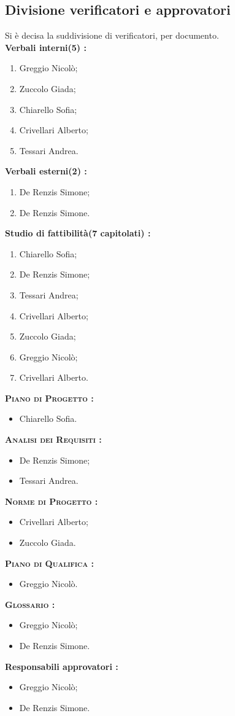 \subsection{Divisione verificatori e approvatori}
Si è decisa la suddivisione di verificatori, per documento.\\
\textbf{Verbali interni(5) :}
\begin{enumerate}
	\item Greggio Nicolò;
	\item Zuccolo Giada;
	\item Chiarello Sofia;
	\item Crivellari Alberto;
	\item Tessari Andrea.
\end{enumerate}
\textbf{Verbali esterni(2) :}
\begin{enumerate}
	\item De Renzis Simone;
	\item De Renzis Simone.
\end{enumerate}
\textbf{Studio di fattibilità(7 capitolati) :}
\begin{enumerate}
	\item Chiarello Sofia;
	\item De Renzis Simone;
	\item Tessari Andrea;
	\item Crivellari Alberto;
	\item Zuccolo Giada;
	\item Greggio Nicolò;
	\item Crivellari Alberto.
\end{enumerate}
\textbf{\textsc{Piano di Progetto :}}
\begin{itemize}
	\item Chiarello Sofia.
\end{itemize}
\textbf{\textsc{Analisi dei Requisiti :}}
\begin{itemize}
	\item De Renzis Simone;
	\item Tessari Andrea.
\end{itemize}
\textbf{\textsc{Norme di Progetto :}}
\begin{itemize}
	\item Crivellari Alberto;
	\item Zuccolo Giada.
\end{itemize}
\textbf{\textsc{Piano di Qualifica :}}
\begin{itemize}
	\item Greggio Nicolò.
\end{itemize}
\textbf{\textsc{Glossario :}}
\begin{itemize}
	\item Greggio Nicolò;
	\item De Renzis Simone.
\end{itemize}
\textbf{Responsabili approvatori :}
\begin{itemize}
	\item Greggio Nicolò;
	\item De Renzis Simone.
\end{itemize}